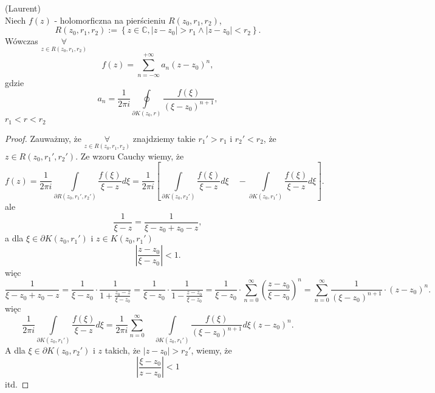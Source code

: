 \documentclass[../main.tex]{subfiles}
\begin{document}
\begin{tw}
    (Laurent)\\
    Niech $f(z)$ - holomorficzna na pierścieniu $R(z_0,r_1,r_2)$,
    \[
        R(z_0,r_1,r_2) := \left\{ z\in\mathbb{C}, |z-z_0|>r_1 \land |z-z_0| < r_2 \right\}
    .\]
Wówczas $\underset{z\in R(z_0,r_1,r_2)}{\forall} $
\[
    f(z) = \sum_{n=-\infty}^{+\infty} a_n(z-z_0)^n
,\]
gdzie
\[
    a_n = \frac{1}{2\pi i} \oint\limits_{\partial K(z_0,r)} \frac{f(\xi)}{(\xi - z_0)^{n+1}}
,\]
$r_1<r<r_2$
\end{tw}
\begin{proof}
    Zauważmy, że
        $\underset{z\in R(z_0,r_1,r_2)}{\forall}$ znajdziemy takie $r_1' > r_1$ i $r_2' < r_2$, że $z\in R(z_0,r_1',r_2')$. Ze wzoru Cauchy wiemy, że
        \[
            f(z) = \frac{1}{2\pi i } \int\limits_{\partial R(z_0,r_1',r_2')}\frac{f(\xi)}{\xi-z}d\xi = \frac{1}{2\pi i}\left[\int\limits_{\partial K(z_0,r_2')}\frac{f(\xi)}{\xi - z}d\xi \quad- \int\limits_{\partial K(z_0,r_1')} \frac{f(\xi)}{\xi - z}d\xi\right]
        .\]
    ale
    \[
    \frac{1}{\xi - z} = \frac{1}{\xi - z_0 + z_0 - z}
    ,\]
a dla $\xi \in \partial K (z_0,r_1')$ i $z\in K(z_0,r_1')$
\[
    \left|\frac{z-z_0}{\xi-z_0}\right| < 1
.\]
więc
\[
    \frac{1}{\xi - z_0 + z_0 - z} = \frac{1}{\xi - z_0}\cdot \frac{1}{1 + \frac{z_0 - z}{\xi - z_0}} = \frac{1}{\xi - z_0}\cdot \frac{1}{1 - \frac{z-z_0}{\xi - z_0}} = \frac{1}{\xi - z_0}\cdot \sum_{n=0}^{\infty} \left(\frac{z-z_0}{\xi - z_0}\right)^n = \sum_{n=0}^{\infty} \frac{1}{(\xi - z_0)^{n+1}}\cdot (z-z_0)^n
.\]
więc
\[
    \frac{1}{2 \pi i}\int\limits_{\partial K(z_0,r_1')}\frac{f(\xi)}{\xi - z}d\xi = \frac{1}{2\pi i} \sum_{n=0}^{\infty}\quad \int\limits_{\partial K(z_0,r_1')}\frac{f(\xi)}{(\xi - z_0)^{n+1}}d\xi (z-z_0)^n
    .\]
A dla $\xi\in\partial K(z_0,r_2')$ i $z$ takich, że $|z - z_0| > r_2'$, wiemy, że
\[
    \left|\frac{\xi - z_0}{z - z_0}\right| < 1
\]
itd.
\end{proof}
\end{document}
